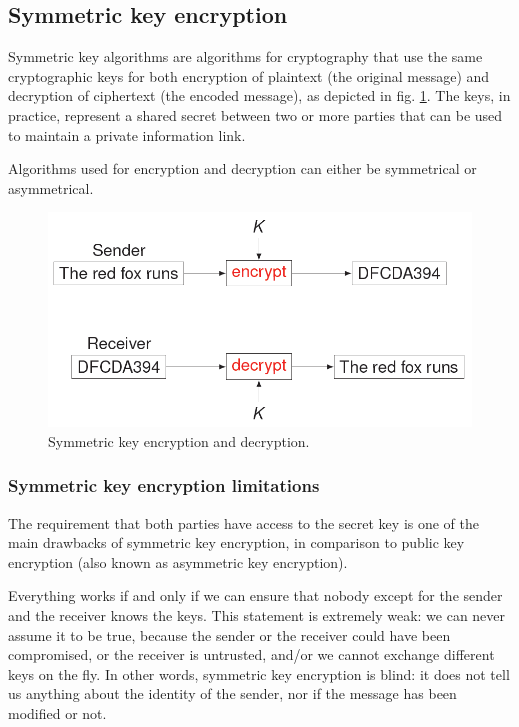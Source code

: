 
\subsection{Symmetric key encryption}
Symmetric key algorithms are algorithms for cryptography that use the same cryptographic keys for both encryption of plaintext (the original message) and decryption of ciphertext (the encoded message), as depicted in fig. \ref{fig:symm}. The keys, in practice, represent a shared secret between two or more parties that can be used to maintain a private information link.

Algorithms used for encryption and decryption can either be symmetrical or asymmetrical.

\begin{figure}[H]
\centering
\includegraphics[scale=0.45]{img/symm.png}
\decoRule
\caption{Symmetric key encryption and decryption.}
\label{fig:symm}
\end{figure}


\subsubsection{Symmetric key encryption limitations}
The requirement that both parties have access to the secret key is one of the main drawbacks of symmetric key encryption, in comparison to public key encryption (also known as asymmetric key encryption).

Everything works if and only if we can ensure that nobody except for the sender and the receiver knows the keys. This statement is extremely weak: we can never assume it to be true, because the sender or the receiver could have been compromised, or the receiver is untrusted, and/or we cannot exchange different keys on the fly. In other words, symmetric key encryption is blind: it does not tell us anything about the identity of the sender, nor if the message has been modified or not.

